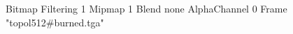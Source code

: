 {Bitmap
	{Filtering 1}
	{Mipmap 1}
	{Blend none}
	{AlphaChannel 0}
	{Frame "topol512#burned.tga"}
}
